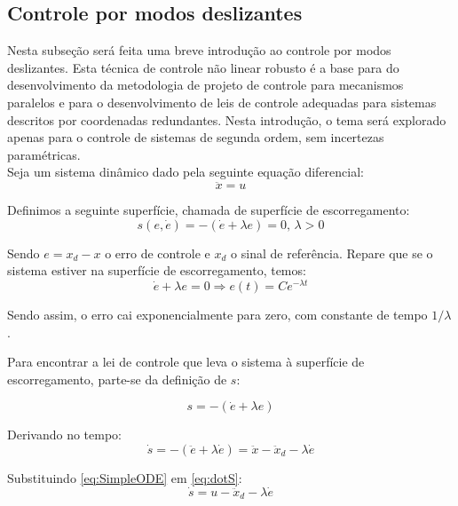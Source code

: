 \documentclass[a4paper,11pt,brazil,fleqn]{article}
\begin{document}
\subsection{Controle por modos deslizantes}\label{S04-2}

Nesta subse\c{c}\~ao ser\'a feita uma breve introdu\c{c}\~ao ao controle por modos deslizantes. Esta t\'ecnica de controle n\~ao linear robusto \'e a base para do desenvolvimento da metodologia de projeto de controle para mecanismos paralelos e para o desenvolvimento de leis de controle adequadas para sistemas descritos por coordenadas redundantes. Nesta introdu\c{c}\~ao, o tema ser\'a explorado apenas para o controle de sistemas de segunda ordem, sem incertezas param\'etricas. \\

Seja um sistema din\^amico dado pela seguinte equa\c{c}\~ao diferencial:
\begin{equation} \label{eq:SimpleODE}
\ddot{x} = u
\end{equation}

Definimos a seguinte superf\'icie, chamada de superf\'icie de escorregamento:
\begin{equation} \label{eq:SlidingSurface}
s(e, \dot{e}) = - (\dot{e} + \lambda e) = 0, \, \lambda > 0
\end{equation}

Sendo $e = x_d - x$ o erro de controle e $x_d$ o sinal de refer\^encia. Repare que se o sistema estiver na superf\'icie de escorregamento, temos:
\begin{equation} \label{eq:SlidingError}
\dot{e} + \lambda e = 0 \Rightarrow e(t) = C e^{- \lambda t}
\end{equation}

Sendo assim, o erro cai exponencialmente para zero, com constante de tempo $1/\lambda$.

Para encontrar a lei de controle que leva o sistema \`a superf\'icie de escorregamento, parte-se da defini\c{c}\~ao de $s$:

$$ s = -(\dot{e} + \lambda e) $$

Derivando no tempo:
\begin{equation} \label{eq:dotS}
\dot{s} =  -(\ddot{e} + \lambda \dot{e}) = \ddot{x} - \ddot{x}_d - \lambda \dot{e} 
\end{equation}

Substituindo \eqref{eq:SimpleODE} em \eqref{eq:dotS}:
\begin{equation} \label{dotS2}
\dot{s} = u - \ddot{x}_d - \lambda \dot{e}
\end{equation}
\end{document}
